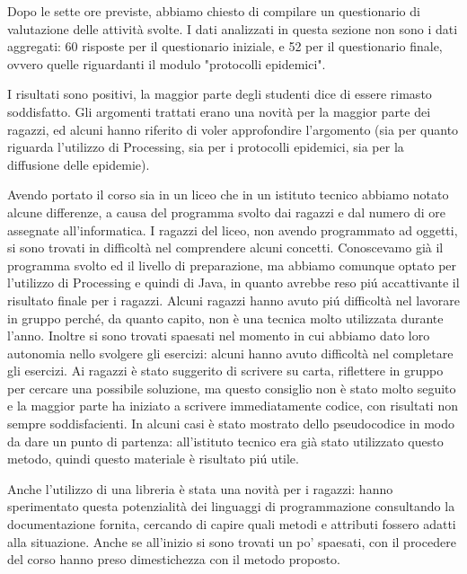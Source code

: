 Dopo le sette ore previste, abbiamo chiesto di compilare un questionario di valutazione delle attività svolte.  I dati analizzati in questa sezione non sono i dati aggregati: 60 risposte per il questionario iniziale, e 52 per il questionario finale, ovvero quelle riguardanti il modulo "protocolli epidemici".

I risultati sono positivi, la maggior parte degli studenti dice di essere rimasto soddisfatto. Gli argomenti trattati erano una novità per la maggior parte dei ragazzi, ed alcuni hanno riferito di voler approfondire l'argomento (sia per quanto riguarda l'utilizzo di Processing, sia per i protocolli epidemici, sia per la diffusione delle epidemie). 

Avendo portato il corso sia in un liceo che in un istituto tecnico abbiamo notato alcune differenze, a causa del programma svolto dai ragazzi e dal numero di ore assegnate all'informatica. I ragazzi del liceo, non avendo programmato ad oggetti, si sono trovati in difficoltà nel comprendere alcuni concetti. Conoscevamo già il programma svolto ed il livello di preparazione, ma abbiamo comunque optato per l'utilizzo di Processing e quindi di Java, in quanto avrebbe reso piú accattivante il risultato finale per i ragazzi. Alcuni ragazzi hanno avuto piú difficoltà nel lavorare in gruppo perché, da quanto capito, non è una tecnica molto utilizzata durante l'anno. Inoltre si sono trovati spaesati nel momento in cui abbiamo dato loro autonomia nello svolgere gli esercizi: alcuni hanno avuto difficoltà nel completare gli esercizi. Ai ragazzi è stato suggerito di scrivere su carta, riflettere in gruppo per cercare una possibile soluzione, ma questo consiglio non è stato molto seguito e la maggior parte ha iniziato a scrivere immediatamente codice, con risultati non sempre soddisfacienti. In alcuni casi è stato mostrato dello pseudocodice in modo da dare un punto di partenza: all'istituto tecnico era già stato utilizzato questo metodo, quindi questo materiale è risultato piú utile.

Anche l'utilizzo di una libreria è stata una novità per i ragazzi: hanno sperimentato questa potenzialità dei linguaggi di programmazione consultando la documentazione fornita, cercando di capire quali metodi e attributi fossero adatti alla situazione. Anche se all'inizio si sono trovati un po' spaesati, con il procedere del corso hanno preso dimestichezza con il metodo proposto.

